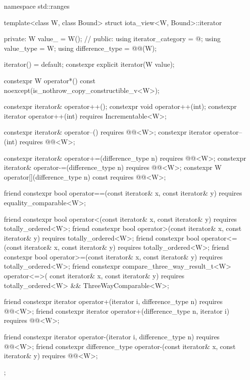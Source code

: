 \begin{codeblock}
namespace std::ranges {
  template<class W, class Bound>
  struct iota_view<W, Bound>::iterator {
  private:
    W value_ = W();             // \expos
  public:
    using iterator_category = @\seebelow@;
    using value_type = W;
    using difference_type = @@(W);

    iterator() = default;
    constexpr explicit iterator(W value);

    constexpr W operator*() const noexcept(is_nothrow_copy_constructible_v<W>);

    constexpr iterator& operator++();
    constexpr void operator++(int);
    constexpr iterator operator++(int) requires Incrementable<W>;

    constexpr iterator& operator--() requires @@<W>;
    constexpr iterator operator--(int) requires @@<W>;

    constexpr iterator& operator+=(difference_type n)
      requires @@<W>;
    constexpr iterator& operator-=(difference_type n)
      requires @@<W>;
    constexpr W operator[](difference_type n) const
      requires @@<W>;

    friend constexpr bool operator==(const iterator& x, const iterator& y)
      requires equality_comparable<W>;

    friend constexpr bool operator<(const iterator& x, const iterator& y)
      requires totally_ordered<W>;
    friend constexpr bool operator>(const iterator& x, const iterator& y)
      requires totally_ordered<W>;
    friend constexpr bool operator<=(const iterator& x, const iterator& y)
      requires totally_ordered<W>;
    friend constexpr bool operator>=(const iterator& x, const iterator& y)
      requires totally_ordered<W>;
    friend constexpr compare_three_way_result_t<W> operator<=>(
        const iterator& x, const iterator& y)
      requires totally_ordered<W> && ThreeWayComparable<W>;

    friend constexpr iterator operator+(iterator i, difference_type n)
      requires @@<W>;
    friend constexpr iterator operator+(difference_type n, iterator i)
      requires @@<W>;

    friend constexpr iterator operator-(iterator i, difference_type n)
      requires @@<W>;
    friend constexpr difference_type operator-(const iterator& x, const iterator& y)
      requires @@<W>;
  };
}
\end{codeblock}

